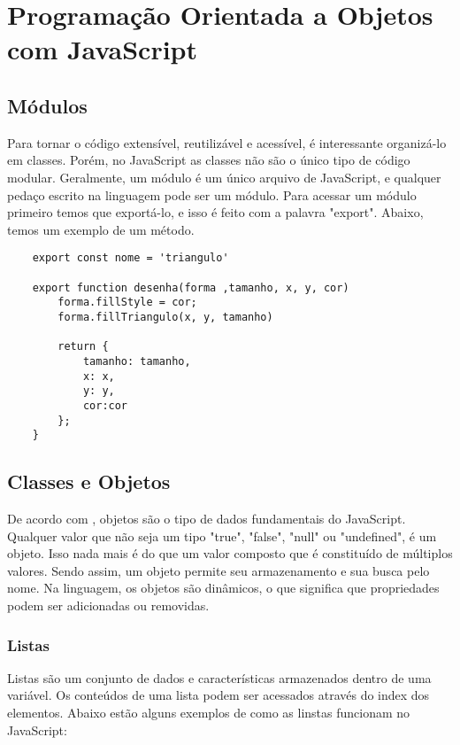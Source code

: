 

\chapter{ Programa\c{c}\~{a}o Orientada a Objetos com JavaScript}


	\section{Módulos}
	Para tornar o código extensível, reutilizável e acessível, é interessante organizá-lo em classes. Porém, no JavaScript as classes não são o único tipo de código modular. Geralmente, um módulo é um único arquivo de JavaScript, e qualquer pedaço escrito na linguagem pode ser um módulo.
	Para acessar um módulo primeiro temos que exportá-lo, e isso é feito com a palavra "export". Abaixo, temos um exemplo de um método. \newline \newline
	
	\begin{lstlisting}
	export const nome = 'triangulo'
	
	export function desenha(forma ,tamanho, x, y, cor)
		forma.fillStyle = cor;
		forma.fillTriangulo(x, y, tamanho)
		
		return {
			tamanho: tamanho,
			x: x,
			y: y,
			cor:cor
		};
	}
	\end{lstlisting}
    \section{Classes e Objetos}
De acordo com \cite{flanagan2020javascript}, objetos são o tipo de dados fundamentais do JavaScript. Qualquer valor que não seja um tipo "true", "false", "null" ou "undefined", é um objeto. Isso nada mais é do que um valor composto que é constituído de múltiplos valores. Sendo assim, um objeto permite seu armazenamento e sua busca pelo nome. Na linguagem, os objetos são dinâmicos, o que significa que propriedades podem ser adicionadas ou removidas. 


\subsection{Listas}
Listas são um conjunto de dados e características armazenados dentro de uma variável. Os conteúdos de uma lista podem ser acessados através do index dos elementos. Abaixo estão alguns exemplos de como as linstas funcionam no JavaScript: \newline \newline


